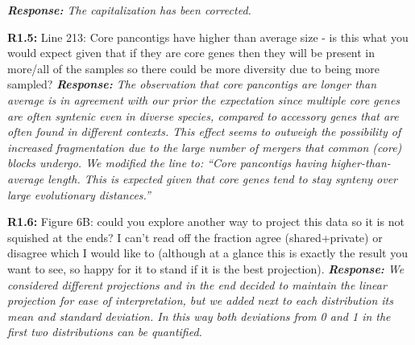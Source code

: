 \documentclass[aps,rmp,onecolumn]{revtex4-1}
\newcommand{\Marco}[1]{{\color{gray}Marco: #1}}
\newcommand{\Liam}[1]{{\color{teal}Liam: #1}}
\newcommand{\reviewer}[2]{\textbf{#1:} #2\vskip 5mm}
\newcommand{\response}[1]{{\it {\color{response}\textbf{Response:} #1}}\vskip 5mm}
\begin{document}
\response{The capitalization has been corrected.}

\reviewer{R1.5}{Line 213: Core pancontigs have higher than average size - is this what you would expect given that if they are core genes then they will be present in more/all of the samples so there could be more diversity due to being more sampled?}
\response{The observation that core pancontigs are longer than average is in agreement with our prior the expectation since multiple core genes are often syntenic even in diverse species, compared to accessory genes that are often found in different contexts. This effect seems to outweigh the possibility of increased fragmentation due to the large number of mergers that common (core) blocks undergo.
      We modified the line to: ``Core pancontigs having higher-than-average length. This is expected given that core genes tend to stay synteny over large evolutionary distances.''}

\reviewer{R1.6}{Figure 6B: could you explore another way to project this data so it is not squished at the ends? I can't read off the fraction agree (shared+private) or disagree which I would like to (although at a glance this is exactly the result you want to see, so happy for it to stand if it is the best projection).}
\response{We considered different projections and in the end decided to maintain the linear projection for ease of interpretation, but we added next to each distribution its mean and standard deviation. In this way both deviations from 0 and 1 in the first two distributions can be quantified.}
\end{document}
